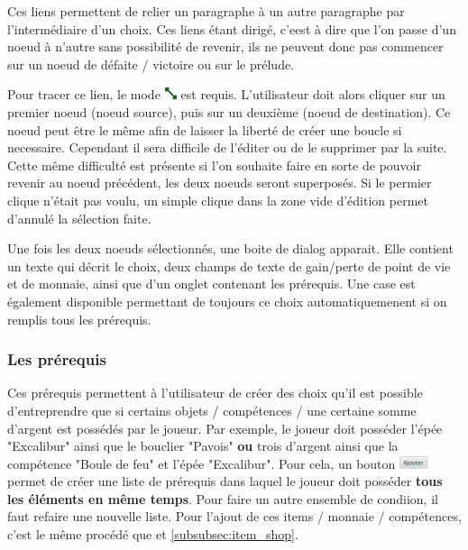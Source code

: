 			Ces liens permettent de relier un paragraphe à un autre paragraphe par l'intermédiaire d'un choix. Ces liens étant dirigé, c'eest à dire que l'on passe d'un noeud à n'autre sans possibilité de revenir, ils ne peuvent donc pas commencer sur un noeud de défaite / victoire ou sur le prélude.

			Pour tracer ce lien, le mode \includegraphics[height=10pt, keepaspectratio]{img/icons/add_link.png} est requis. L'utilisateur doit alors cliquer sur un premier noeud (noeud source), puis sur un deuxième (noeud de destination). Ce noeud peut être le même afin de laisser la liberté de créer une boucle si necessaire. Cependant il sera difficile de l'éditer ou de le supprimer par la suite. Cette même difficulté est présente si l'on souhaite faire en sorte de pouvoir revenir au noeud précédent, les deux noeuds seront superposés. Si le permier clique n'était pas voulu, un simple clique dans la zone vide d'édition permet d'annulé la sélection faite.

			Une fois les deux noeuds sélectionnés, une boite de dialog apparait. Elle contient un texte qui décrit le choix, deux champs de texte de gain/perte de point de vie et de monnaie, ainsi que d'un onglet contenant les prérequis. Une case est également disponible permettant de toujours ce choix automatiquemenent si on remplis tous les prérequis.

			\subsubsection{Les prérequis}
				\label{sec:prerequis}

				Ces prérequis permettent à l'utilisateur de créer des choix qu'il est possible d'entreprendre que si certains objets / compétences / une certaine somme d'argent est possédés par le joueur. Par exemple, le joueur doit posséder l'épée "Excalibur" ainsi que le bouclier "Pavois" \textbf{ou} trois d'argent ainsi que la compétence "Boule de feu" et l'épée "Excalibur". Pour cela, un bouton \includegraphics[height=10pt, keepaspectratio]{img/ajouterBouton.png} permet de créer une liste de prérequis dans laquel le joueur doit posséder \textbf{tous les éléments en même temps}. Pour faire un autre ensemble de condiion, il faut refaire une nouvelle liste.
				Pour l'ajout de ces items / monnaie / compétences, c'est le même procédé que  et \ref{subsubsec:item_shop}.

